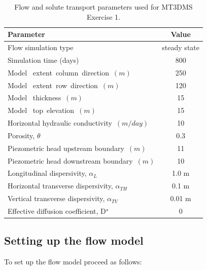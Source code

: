 \begin{table}[hb]
\caption{Flow and solute transport parameters used for MT3DMS Exercise 1.}
\begin{center}
\begin{tabular}{lc} 
\toprule
Parameter                                            &         Value \\
\midrule
Flow simulation type                                 &        steady state \\
Simulation time (days)                               &  800           \\
Model \  extent\ column\ direction\ $ (m)$           &  250            \\
Model \  extent\ row\ direction\ $ (m)  $            &  120            \\
Model \  thickness\ $(m)$                            &   15            \\
Model \ top\ elevation\ $(m)$                        &   15            \\
Horizontal hydraulic conductivity\ $(m/day)$         &   10     \\ 
Porosity, $\theta$                                   &           0.3  \\
Piezometric head upstream boundary\ $(m) $           &  11        \\ 
Piezometric head downstream boundary\ $(m) $         &  10            \\ 
Longitudinal dispersivity, $\alpha_L$                &           1.0 m \\
Horizontal transverse dispersivity, $\alpha_{TH}$    &           0.1 m \\
Vertical transverse dispersivity,   $\alpha_{TV}$    &           0.01 m \\
Effective diffusion coefficient, D$^{\star}$          &             0  \\
\bottomrule

\end{tabular}
\label{single_spec_table_1}
\end{center}
\end{table}

\subsection{Setting up the flow model}

To set up the flow model proceed as follows:

